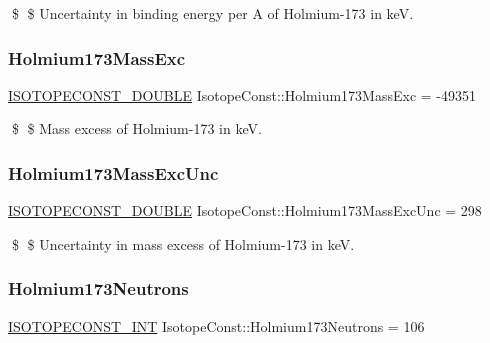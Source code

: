 \$ \$ Uncertainty in binding energy per A of Holmium-\/173 in keV. \mbox{\label{group___isotope_const-_holmium-_ho173_ga6f04889b7fcb30e69cdda24b49f20dbe}} 
\subsubsection{\texorpdfstring{Holmium173\+Mass\+Exc}{Holmium173MassExc}}
{\footnotesize\ttfamily \mbox{\hyperlink{group___isotope_const-_macros_ga8f45a7272ce02c0b4c65c44636ed719a}{I\+S\+O\+T\+O\+P\+E\+C\+O\+N\+S\+T\+\_\+\+D\+O\+U\+B\+LE}} Isotope\+Const\+::\+Holmium173\+Mass\+Exc = -\/49351}

\$ \$ Mass excess of Holmium-\/173 in keV. \mbox{\label{group___isotope_const-_holmium-_ho173_gaa9d2e7ec412e77ceb4a7a67a2d56fcd5}} 
\subsubsection{\texorpdfstring{Holmium173\+Mass\+Exc\+Unc}{Holmium173MassExcUnc}}
{\footnotesize\ttfamily \mbox{\hyperlink{group___isotope_const-_macros_ga8f45a7272ce02c0b4c65c44636ed719a}{I\+S\+O\+T\+O\+P\+E\+C\+O\+N\+S\+T\+\_\+\+D\+O\+U\+B\+LE}} Isotope\+Const\+::\+Holmium173\+Mass\+Exc\+Unc = 298}

\$ \$ Uncertainty in mass excess of Holmium-\/173 in keV. \mbox{\label{group___isotope_const-_holmium-_ho173_ga719f249c2b460e3b8d79f19a32a31cce}} 
\subsubsection{\texorpdfstring{Holmium173\+Neutrons}{Holmium173Neutrons}}
{\footnotesize\ttfamily \mbox{\hyperlink{group___isotope_const-_macros_ga5f18360b3e99483a35c32d789e62621c}{I\+S\+O\+T\+O\+P\+E\+C\+O\+N\+S\+T\+\_\+\+I\+NT}} Isotope\+Const\+::\+Holmium173\+Neutrons = 106}

